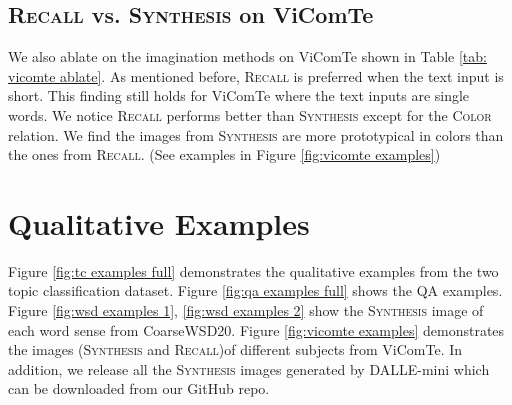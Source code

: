 \documentclass[11pt]{article}
\newcommand{\model}{Z-LaVI}
\begin{document}
\subsection{\textsc{Recall} vs. \textsc{Synthesis} on ViComTe}
We also ablate on the imagination methods on ViComTe shown in Table \ref{tab: vicomte ablate}. As mentioned before, \textsc{Recall} is preferred when the text input is short. This finding still holds for ViComTe where the text inputs are single words. We notice \textsc{Recall} performs better than \textsc{Synthesis} except for the \textsc{Color} relation. We find the images from \textsc{Synthesis} are more prototypical in colors than the ones from \textsc{Recall}. (See examples in Figure \ref{fig:vicomte examples})
\begin{table}[!htbp]
\centering
{}
\caption{The average Spearman correlation (left) and top-1 accuracy (right) of \model~w/o LM with different imagination methods. The highest number of each row is \textbf{bolded} and the second-best one is \underline{underlined}.}
\label{tab: vicomte ablate}
\end{table} 

\section{Qualitative Examples} \label{appendix: qual examples}
Figure \ref{fig:tc examples full} demonstrates the qualitative examples from the two topic classification dataset. Figure \ref{fig:qa examples full} shows the QA examples. Figure \ref{fig:wsd examples 1}, \ref{fig:wsd examples 2} show the \textsc{Synthesis} image of each word sense from CoarseWSD20. Figure \ref{fig:vicomte examples} demonstrates the images (\textsc{Synthesis} and \textsc{Recall})of different subjects from ViComTe. In addition, we release all the \textsc{Synthesis} images generated by DALLE-mini which can be downloaded from our GitHub repo.
\end{document}
